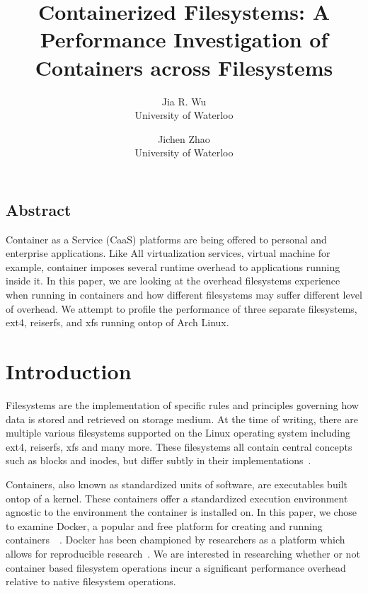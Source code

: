 \documentclass[letterpaper,twocolumn,10pt]{article}
\begin{document}
\date{}

\title{\Large \bf Containerized Filesystems: A Performance Investigation of Containers across Filesystems}

\author{
{\rm Jia R. Wu}\\
University of Waterloo
\and
{\rm Jichen Zhao}\\
University of Waterloo
} %

\maketitle

\thispagestyle{empty}


\subsection*{Abstract}

Container as a Service (CaaS) platforms are being offered to personal and enterprise applications.
Like All virtualization services, virtual machine for example, container imposes several runtime overhead to applications running inside it.
In this paper, we are looking at the overhead filesystems experience when running in containers and how different filesystems may suffer 
different level of overhead.
We attempt to profile the performance of three separate filesystems, ext4, reiserfs, and xfs running ontop of Arch Linux.



\section{Introduction}
Filesystems are the implementation of specific rules and principles governing how data is stored and retrieved on storage medium. At the time of writing, there are multiple various filesystems supported on the Linux operating system including ext4, reiserfs, xfs and many more. These filesystems all contain central concepts such as blocks and inodes, but differ subtly in their implementations~\cite{TLDP}.

Containers, also known as standardized units of software, are executables built ontop of a kernel. These containers offer a standardized execution environment agnostic to the environment the container is installed on. In this paper, we chose to examine Docker, a popular and free platform for creating and running containers~\cite{anderson2015docker}~\cite{rad2017introduction}. Docker has been championed by researchers as a platform which allows for reproducible research~\cite{boettiger2015introduction}. We are interested in researching whether or not container based filesystem operations incur a significant performance overhead relative to native filesystem operations.
\end{document}
